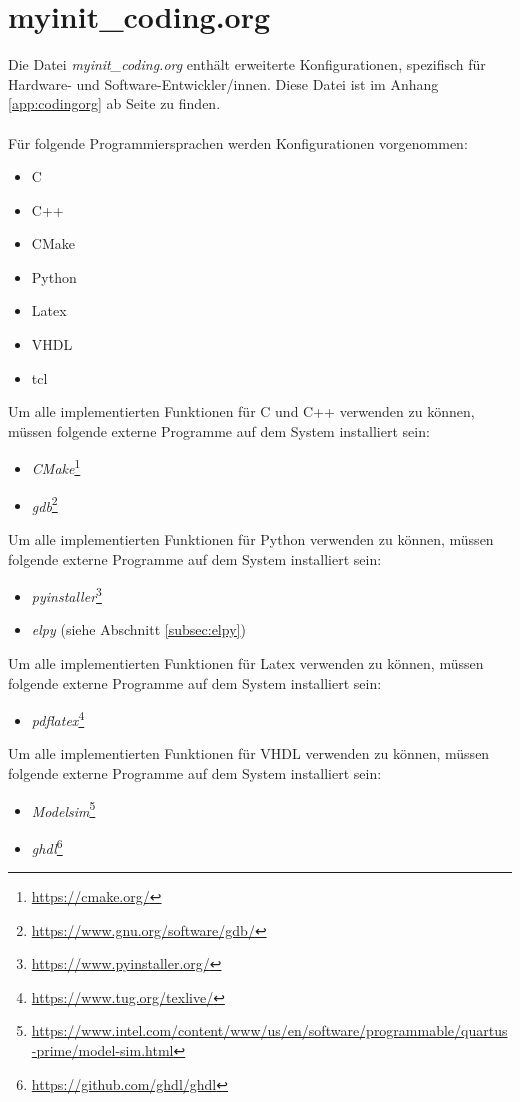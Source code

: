 \section{myinit\_coding.org}
\label{sec:myinitcoding}
Die Datei \textit{myinit\_coding.org} enthält erweiterte
Konfigurationen, spezifisch für Hardware- und
Software-Entwickler/innen. Diese Datei ist im Anhang
\ref{app:codingorg} ab Seite \pageref{app:codingorg} zu
finden.\\\\ Für folgende Programmiersprachen werden Konfigurationen
vorgenommen:
\begin{itemize}
\item C
\item C++
\item CMake
\item Python
\item Latex
\item VHDL
\item tcl\\
\end{itemize}
Um alle implementierten Funktionen für C und C++ verwenden zu können,
müssen folgende externe Programme auf dem System installiert sein:
\begin{itemize}
\item \textit{CMake}\footnote{\url{https://cmake.org/}}
\item \textit{gdb}\footnote{\url{https://www.gnu.org/software/gdb/}}\\
\end{itemize}
Um alle implementierten Funktionen für Python verwenden zu können,
müssen folgende externe Programme auf dem System installiert sein:
\begin{itemize}
\item \textit{pyinstaller}\footnote{\url{https://www.pyinstaller.org/}}
\item \textit{elpy} (siehe Abschnitt \ref{subsec:elpy})\\
\end{itemize}
Um alle implementierten Funktionen für Latex verwenden zu können,
müssen folgende externe Programme auf dem System installiert sein:
\begin{itemize}
\item \textit{pdflatex}\footnote{\url{https://www.tug.org/texlive/}}\\
\end{itemize}
Um alle implementierten Funktionen für VHDL verwenden zu können,
müssen folgende externe Programme auf dem System installiert sein:
\begin{itemize}
\item
  \textit{Modelsim}\footnote{\url{https://www.intel.com/content/www/us/en/software/programmable/quartus-prime/model-sim.html}}
\item \textit{ghdl}\footnote{\url{https://github.com/ghdl/ghdl}}\\
\end{itemize}

